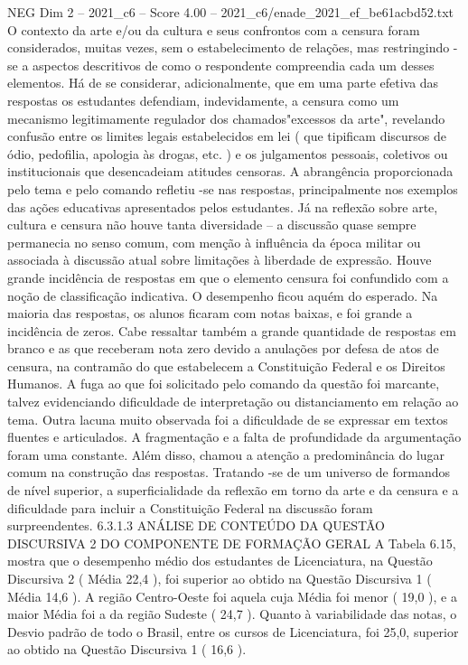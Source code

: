 \begin{textsample}{NEG Dim 2 – 2021\_c6 – Score 4.00 – 2021\_c6/enade\_2021\_ef\_be61acbd52.txt}
O contexto da arte e/ou da cultura e seus confrontos com a censura foram considerados, muitas vezes, sem o estabelecimento de relações, mas restringindo -se a aspectos descritivos de como o respondente compreendia cada um desses elementos.
Há de se considerar, adicionalmente, que em uma parte efetiva das respostas os estudantes defendiam, indevidamente, a censura como um mecanismo legitimamente regulador dos chamados"excessos da arte", revelando confusão entre os limites legais estabelecidos em lei ( que tipificam discursos de ódio, pedofilia, apologia às drogas, etc. ) e os julgamentos pessoais, coletivos ou institucionais que desencadeiam atitudes censoras.
A abrangência proporcionada pelo tema e pelo comando refletiu -se nas respostas, principalmente nos exemplos das ações educativas apresentados pelos estudantes.
Já na reflexão sobre arte, cultura e censura não houve tanta diversidade – a discussão quase sempre permanecia no senso comum, com menção à influência da época militar ou associada à discussão atual sobre limitações à liberdade de expressão.
Houve grande incidência de respostas em que o elemento censura foi confundido com a noção de classificação indicativa.
O desempenho ficou aquém do esperado.
Na maioria das respostas, os alunos ficaram com notas baixas, e foi grande a incidência de zeros.
Cabe ressaltar também a grande quantidade de respostas em branco e as que receberam nota zero devido a anulações por defesa de atos de censura, na contramão do que estabelecem a Constituição Federal e os Direitos Humanos.
A fuga ao que foi solicitado pelo comando da questão foi marcante, talvez evidenciando dificuldade de interpretação ou distanciamento em relação ao tema.
Outra lacuna muito observada foi a dificuldade de se expressar em textos fluentes e articulados.
A fragmentação e a falta de profundidade da argumentação foram uma constante.
Além disso, chamou a atenção a predominância do lugar comum na construção das respostas.
Tratando -se de um universo de formandos de nível superior, a superficialidade da reflexão em torno da arte e da censura e a dificuldade para incluir a Constituição Federal na discussão foram surpreendentes. 6.3.1.3 ANÁLISE DE CONTEÚDO DA QUESTÃO DISCURSIVA 2 DO COMPONENTE DE FORMAÇÃO GERAL A Tabela 6.15, mostra que o desempenho médio dos estudantes de Licenciatura, na Questão Discursiva 2 ( Média 22,4 ), foi superior ao obtido na Questão Discursiva 1 ( Média 14,6 ).
A região Centro-Oeste foi aquela cuja Média foi menor ( 19,0 ), e a maior Média foi a da região Sudeste ( 24,7 ).
Quanto à variabilidade das notas, o Desvio padrão de todo o Brasil, entre os cursos de Licenciatura, foi 25,0, superior ao obtido na Questão Discursiva 1 ( 16,6 ).

\end{textsample}
